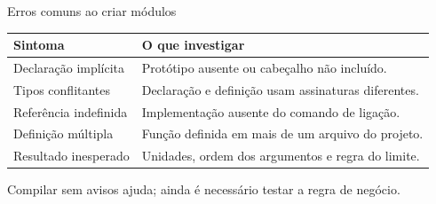 \begin{frame}{Erros comuns ao criar módulos}
\small
\begin{tabularx}{\textwidth}{p{3.7cm}X}
\toprule
Sintoma & O que investigar \\
\midrule
Declaração implícita & Protótipo ausente ou cabeçalho não incluído. \\
Tipos conflitantes & Declaração e definição usam assinaturas diferentes. \\
Referência indefinida & Implementação ausente do comando de ligação. \\
Definição múltipla & Função definida em mais de um arquivo do projeto. \\
Resultado inesperado & Unidades, ordem dos argumentos e regra do limite. \\
\bottomrule
\end{tabularx}
\vspace{0.3cm}
Compilar sem avisos ajuda; ainda é necessário testar a regra de negócio.
\end{frame}
